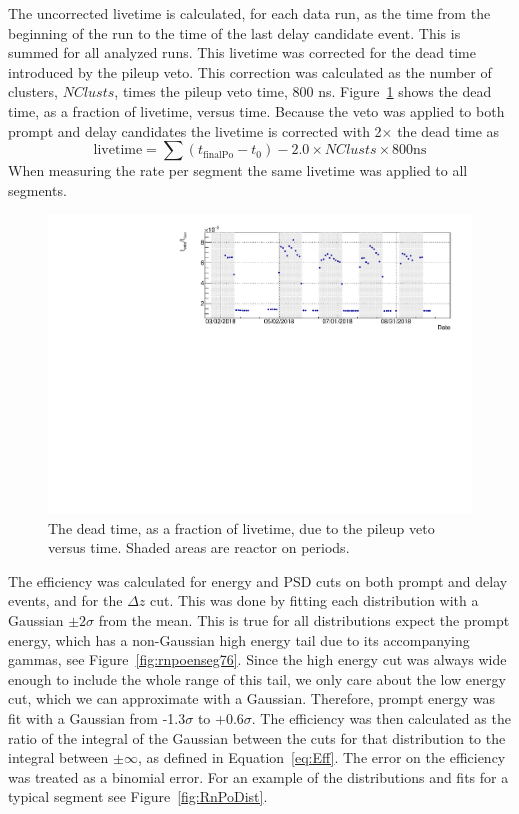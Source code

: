 The uncorrected livetime is calculated, for each data run, as the time from the beginning of the run to the time of the last delay candidate event. 
This is summed for all analyzed runs. 
This livetime was corrected for the dead time introduced by the pileup veto.
This correction was calculated as the number of clusters, $NClusts$, times the pileup veto time, 800 ns.
Figure~\ref{fig:vetotimevstime} shows the dead time, as a fraction of livetime, versus time.
Because the veto was applied to both prompt and delay candidates the livetime is corrected with 2$\times$ the dead time as
\begin{equation}
	\textrm{livetime} = \sum(t_{\textrm{finalPo}} - t_0) - 2.0 \times NClusts \times 800\textrm{ns}
\end{equation}
When measuring the rate per segment the same livetime was applied to all segments. 

\begin{figure}[!t]
	\centering
	\includegraphics[width=0.8\linewidth]{tex/6-ac227-images/AD_RateCalc/VetoTimeVsTime}
	\caption{The dead time, as a fraction of livetime, due to the pileup veto versus time. Shaded areas are reactor on periods.}
	\label{fig:vetotimevstime}
\end{figure}

The efficiency was calculated for energy and PSD cuts on both prompt and delay events, and for the $\Delta z$ cut.
This was done by fitting each distribution with a Gaussian $\pm 2\sigma$ from the mean.
This is true for all distributions expect the prompt energy, which has a non-Gaussian high energy tail due to its accompanying gammas, see Figure~\ref{fig:rnpoenseg76}. 
Since the high energy cut was always wide enough to include the whole range of this tail, we only care about the low energy cut, which we can approximate with a Gaussian.
Therefore, prompt energy was fit with a Gaussian from -1.3$\sigma$ to +0.6$\sigma$.
The efficiency was then calculated as the ratio of the integral of the Gaussian
between the cuts for that distribution to the integral between $\pm \infty$, as defined in Equation~\ref{eq:Eff}.
The error on the efficiency was treated as a binomial error.
For an example of the distributions and fits for a typical segment see Figure~\ref{fig:RnPoDist}.

